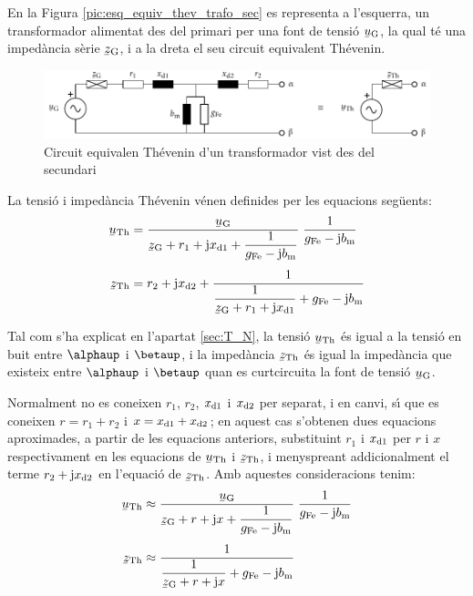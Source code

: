 En la Figura \vref{pic:esq_equiv_thev_trafo_sec}  es representa a
l'esquerra, un transformador alimentat des del primari per una font
de tensi\'{o} $\cmplx{u}\ped{G}$, la qual t\'{e} una imped\`{a}ncia s\`{e}rie
$\cmplx{z}\ped{G}$, i a  la dreta el seu circuit equivalent
Th\'{e}venin.

\begin{figure}[htb]
\centering
    \includegraphics{Imatges/Cap-TrafosPot-Esq-Equiv-Thevenin.pdf}
\caption{Circuit equivalen Th\'{e}venin d'un transformador vist des del
secundari} \label{pic:esq_equiv_thev_trafo_sec}
\end{figure}

La tensi\'{o} i imped\`{a}ncia Th\'{e}venin v\'{e}nen definides per les equacions
seg\"{u}ents:
\begin{align}
    \cmplx{u}\ped{Th} &= \frac{\cmplx{u}\ped{G}}{\cmplx{z}\ped{G} + r_1 + \ju
    x\ped{d1} + \dfrac{1}{g\ped{Fe}-\ju b\ped{m}}} \;\frac{1}{g\ped{Fe}-\ju
    b\ped{m}} \label{eq:trafo_uth}\\[1ex]
    \cmplx{z}\ped{Th} &= r_2 + \ju x\ped{d2} + \frac{1}{\dfrac{1}{\cmplx{z}\ped{G} + r_1 +
    \ju x\ped{d1}} + g\ped{Fe}-\ju b\ped{m}}\label{eq:trafo_zth}
\end{align}

Tal com s'ha explicat en l'apartat \vref{sec:T_N}, la tensi\'{o}
$\cmplx{u}\ped{Th}$ \'{e}s igual a la tensi\'{o} en buit entre $\alphaup$ i
$\betaup$, i la imped\`{a}ncia $\cmplx{z}\ped{Th}$ \'{e}s igual la imped\`{a}ncia
que existeix entre $\alphaup$ i $\betaup$ quan es curtcircuita la font
de tensi\'{o} $\cmplx{u}\ped{G}$.

Normalment no es coneixen $r_1$, $r_2$, $x_\mathrm{d1}$ i $x_\mathrm{d2}$ per separat, i
en canvi, s\'{\i} que es coneixen $r=r_1+r_2$ i $x=x_\mathrm{d1}+x_\mathrm{d2}$; en aquest
cas s'obtenen dues equacions aproximades, a partir de les equacions
anteriors, substituint $r_1$ i $x_\mathrm{d1}$ per $r$ i $x$ respectivament en
les equacions de $\cmplx{u}\ped{Th}$ i $\cmplx{z}\ped{Th}$, i
menyspreant addicionalment el terme $r_2 + \mathrm{j} x_\mathrm{d2}$ en l'equaci\'{o}
de $\cmplx{z}\ped{Th}$. Amb aquestes consideracions tenim:
\begin{align}
    \cmplx{u}\ped{Th} &\approx \frac{\cmplx{u}\ped{G}}{\cmplx{z}\ped{G} + r + \ju
    x + \dfrac{1}{g\ped{Fe}-\ju b\ped{m}}} \;\frac{1}{g\ped{Fe}-\ju
    b\ped{m}} \label{eq:trafo_uth_aprx}\\[1ex]
    \cmplx{z}\ped{Th} &\approx \frac{1}{\dfrac{1}{\cmplx{z}\ped{G} + r +
    \ju x} + g\ped{Fe}-\ju b\ped{m}}\label{eq:trafo_zth_aprx}
\end{align}

